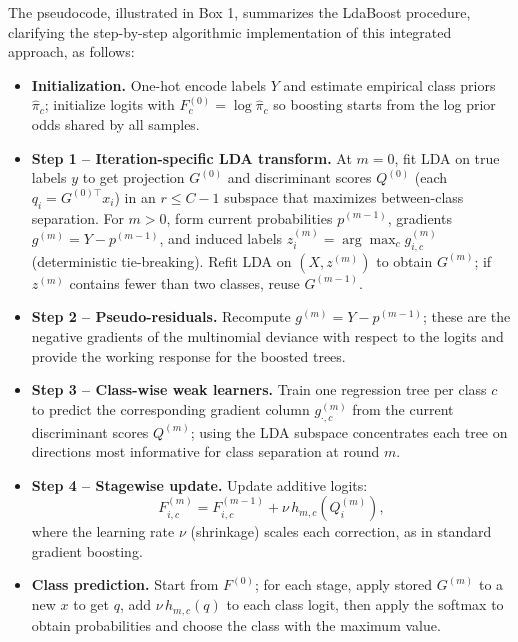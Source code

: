 \documentclass[11pt,a4paper]{article}
\begin{document}
The pseudocode, illustrated in Box 1, summarizes the LdaBoost procedure, clarifying the step-by-step algorithmic implementation of this integrated approach, as follows:

\begin{itemize}
    \item \textbf{Initialization.} One-hot encode labels $Y$ and estimate empirical class priors $\hat{\pi}_c$; initialize logits with $F^{(0)}_c = \log \hat{\pi}_c$ so boosting starts from the log prior odds shared by all samples.

    \item \textbf{Step 1 – Iteration-specific LDA transform.} At $m=0$, fit LDA on true labels $y$ to get projection $G^{(0)}$ and discriminant scores $Q^{(0)}$ (each $q_i = G^{(0)\top} x_i$) in an $r \le C-1$ subspace that maximizes between-class separation.  
    For $m>0$, form current probabilities $p^{(m-1)}$, gradients $g^{(m)} = Y - p^{(m-1)}$, and induced labels $z_i^{(m)}=\arg\max_c g^{(m)}_{i,c}$ (deterministic tie-breaking). Refit LDA on $(X,z^{(m)})$ to obtain $G^{(m)}$; if $z^{(m)}$ contains fewer than two classes, reuse $G^{(m-1)}$.

    \item \textbf{Step 2 – Pseudo-residuals.} Recompute $g^{(m)} = Y - p^{(m-1)}$; these are the negative gradients of the multinomial deviance with respect to the logits and provide the working response for the boosted trees.

    \item \textbf{Step 3 – Class-wise weak learners.} Train one regression tree per class $c$ to predict the corresponding gradient column $g^{(m)}_{\cdot,c}$ from the current discriminant scores $Q^{(m)}$; using the LDA subspace concentrates each tree on directions most informative for class separation at round $m$.

    \item \textbf{Step 4 – Stagewise update.} Update additive logits:
    \[
    F^{(m)}_{i,c} = F^{(m-1)}_{i,c} + \nu \, h_{m,c}\left(Q^{(m)}_i\right),
    \]
    where the learning rate $\nu$ (shrinkage) scales each correction, as in standard gradient boosting.

    \item \textbf{Class prediction.} Start from $F^{(0)}$; for each stage, apply stored $G^{(m)}$ to a new $x$ to get $q$, add $\nu \, h_{m,c}(q)$ to each class logit, then apply the softmax to obtain probabilities and choose the class with the maximum value.
\end{itemize}
\end{document}
